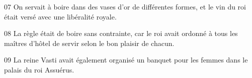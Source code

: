 
07 On servait à boire dans des vases d’or de différentes formes, et le vin du roi était versé avec une libéralité royale.

08 La règle était de boire sans contrainte, car le roi avait ordonné à tous les maîtres d’hôtel de servir selon le bon plaisir de chacun.

09 La reine Vasti avait également organisé un banquet pour les femmes dans le palais du roi Assuérus.